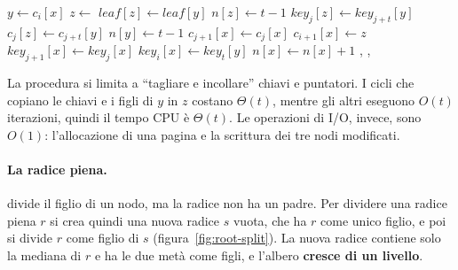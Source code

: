 \begin{algorithm}[htbp]
\caption{La divisione del figlio pieno $y = c_i[x]$ di un nodo $x$ non pieno. Si assume che $x$ e $y$ siano già in memoria principale.}\label{alg:split-child}
\begin{algorithmic}[1]
  \State $y \gets c_i[x]$
  \State $z \gets$ 
  \State $\mathit{leaf}[z] \gets \mathit{leaf}[y]$
  \State $n[z] \gets t-1$
   
    \State $\mathit{key}_j[z] \gets \mathit{key}_{j+t}[y]$
  \EndFor
   
      \State $c_j[z] \gets c_{j+t}[y]$
    \EndFor
  \EndIf
  \State $n[y] \gets t-1$
   
    \State $c_{j+1}[x] \gets c_j[x]$
  \EndFor
  \State $c_{i+1}[x] \gets z$
   
    \State $\mathit{key}_{j+1}[x] \gets \mathit{key}_j[x]$
  \EndFor
  \State $\mathit{key}_i[x] \gets \mathit{key}_t[y]$
  \State $n[x] \gets n[x]+1$
  \State {}, , 
\EndProcedure
\end{algorithmic}
\end{algorithm}

La procedura si limita a ``tagliare e incollare'' chiavi e puntatori. I cicli che copiano le chiavi e i figli di $y$ in $z$ costano $\Theta(t)$, mentre gli altri eseguono $O(t)$ iterazioni, quindi il tempo CPU è $\Theta(t)$. Le operazioni di I/O, invece, sono $O(1)$: l'allocazione di una pagina e la scrittura dei tre nodi modificati.

\paragraph{La radice piena.}
\BTreeSplitChild{} divide il figlio di un nodo, ma la radice non ha un padre. Per dividere una radice piena $r$ si crea quindi una nuova radice $s$ vuota, che ha $r$ come unico figlio, e poi si divide $r$ come figlio di $s$ (figura~\ref{fig:root-split}). La nuova radice contiene solo la mediana di $r$ e ha le due metà come figli, e l'albero \textbf{cresce di un livello}.

